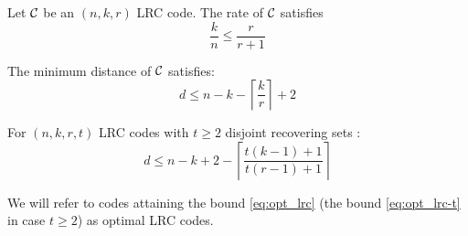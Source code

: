 \begin{thm}
Let ${\mathcal C}$ be an $(n,k,r)$ LRC code. The rate of ${\mathcal C}$ satisfies
\begin{equation}
    \frac{k}{n} \leq \frac{r}{r+1}
\end{equation}

\noindent The minimum distance of ${\mathcal C}$ satisfies:
\begin{equation}\label{eq:opt_lrc}
d \leq n -k - \left\lceil \frac{k}{r} \right\rceil + 2
\end{equation}


\end{thm}


\begin{thm}

For $(n,k,r,t)$ LRC codes with $t \geq 2$ disjoint recovering sets :
\begin{equation}\label{eq:opt_lrc-t}
    d \leq n-k + 2 - \left\lceil \frac{t(k-1)+1}{t(r-1)+1} \right\rceil
\end{equation}
\end{thm}

We will refer to codes attaining the bound \ref{eq:opt_lrc} (the bound \ref{eq:opt_lrc-t} in case $t \geq 2$) as optimal LRC codes.